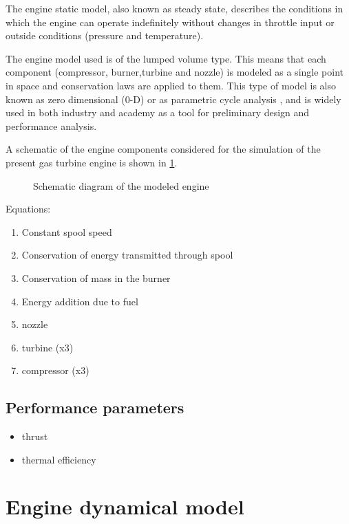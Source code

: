 \documentclass[tcc]{subfiles}
\begin{document}
The engine static model, also known as steady state, 
describes the conditions in which the engine can operate indefinitely 
without changes in throttle input or outside conditions (pressure and temperature).

The engine model used is of the lumped volume type. This means that each component 
 (compressor, burner,turbine and nozzle)
 is modeled as a single point in space and conservation laws are applied to them.
 This type of model is also known as zero dimensional (0-D) or as parametric cycle analysis
 ,
 and is widely used in both industry and academy as a tool for preliminary design and 
 performance analysis. 

A schematic of the engine components considered for the simulation of the present gas turbine engine is shown in \cref{fig:engine}.

\begin{figure}
    \sffamily\small 
    \caption{Schematic diagram of the modeled engine}
    \label{fig:engine}
    \hfill\hfill
\end{figure}

Equations:
\begin{enumerate}
    \item Constant spool speed
    \item Conservation of energy transmitted through spool
    \item Conservation of mass in the burner
    \item Energy addition due to fuel
    \item nozzle
    \item turbine (x3)
    \item compressor (x3)
\end{enumerate}



\subsection{Performance parameters}
\begin{itemize}
    \item thrust
    \item thermal efficiency
\end{itemize}

\section{Engine dynamical model}
\end{document}
